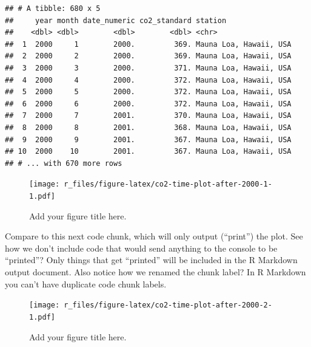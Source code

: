 \documentclass[]{Nemilov}
\newenvironment{Shaded}{\begin{snugshade}}{\end{snugshade}}
\newcommand{\BaseNTok}[1]{\textcolor[rgb]{0.00,0.00,0.81}{#1}}
\newcommand{\FunctionTok}[1]{\textcolor[rgb]{0.00,0.00,0.00}{#1}}
\newcommand{\NormalTok}[1]{#1}
\begin{document}
\begin{verbatim}
## # A tibble: 680 x 5
##     year month date_numeric co2_standard station               
##    <dbl> <dbl>        <dbl>        <dbl> <chr>                 
##  1  2000     1        2000.         369. Mauna Loa, Hawaii, USA
##  2  2000     2        2000.         369. Mauna Loa, Hawaii, USA
##  3  2000     3        2000.         371. Mauna Loa, Hawaii, USA
##  4  2000     4        2000.         372. Mauna Loa, Hawaii, USA
##  5  2000     5        2000.         372. Mauna Loa, Hawaii, USA
##  6  2000     6        2000.         372. Mauna Loa, Hawaii, USA
##  7  2000     7        2001.         370. Mauna Loa, Hawaii, USA
##  8  2000     8        2001.         368. Mauna Loa, Hawaii, USA
##  9  2000     9        2001.         367. Mauna Loa, Hawaii, USA
## 10  2000    10        2001.         367. Mauna Loa, Hawaii, USA
## # ... with 670 more rows
\end{verbatim}

\begin{figure}
\centering
\texttt{[image: r\_files/figure-latex/co2-time-plot-after-2000-1-1.pdf]}
\caption{\label{fig:co2-time-plot-after-2000-1}Add your figure title here.}
\end{figure}

Compare to this next code chunk, which will only output (``print'') the plot. See
how we don't include code that would send anything to the console to be
``printed''? Only things that get ``printed'' will be included in the R Markdown output
document. Also notice how we renamed the chunk label? In R Markdown you can't
have duplicate code chunk labels.

\begin{Shaded}
\end{Shaded}

\begin{figure}
\centering
\texttt{[image: r\_files/figure-latex/co2-time-plot-after-2000-2-1.pdf]}
\caption{\label{fig:co2-time-plot-after-2000-2}Add your figure title here.}
\end{figure}
\end{document}
